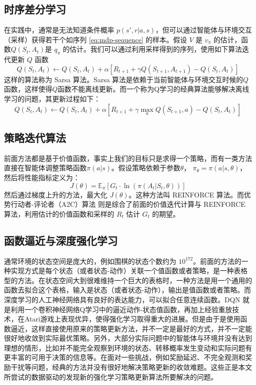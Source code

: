 \subsection{时序差分学习}
在实践中，通常是无法知道条件概率 $p(s', r | a, s)$，但可以通过智能体与环境交互（采样）获得若干个如序列 \ref{eq:mdp-sequence} 的样本。假设 $V$ 是 $v_\pi$ 的估计，函数$Q(S_t, A_t)$是 $q_\pi$ 的估计。我们可以通过利用采样得到的序列，使用如下算法迭代更新 $Q$ 函数
\begin{equation}
    Q(S_t, A_t) \leftarrow Q(S_t, A_t) + \alpha \left[ R_{t+1} + \gamma Q(S_{t+1}, A_{t+1}) - Q(S_t, A_t) \right]
\end{equation}
这样的算法称为 Sarsa 算法\cite{suttonReinforcementLearningIntroduction2018}。Sarsa 算法是依赖于当前智能体与环境交互时候的$Q$函数，这样使得$Q$函数不能离线更新。而一个称为Q学习\cite{watkinsQlearning1992}的经典算法能够解决离线学习的问题，其更新过程如下：
\begin{equation}
    Q(S_t, A_t) \leftarrow Q(S_t, A_t) + \alpha \left[ R_{t+1} + \gamma \max_{a} Q(S_{t+1}, a) - Q(S_t, A_t) \right]
\end{equation}


\subsection{策略迭代算法}
前面方法都是基于价值函数，事实上我们的目标只是求得一个策略，而有一类方法直接在智能体调整策略函数$\pi(a|s)$。假设策略依赖于参数$\theta$， $\pi_\theta = \pi(a|s,\theta)$，然后将性能指标定义为：
\begin{equation}
    J(\theta) = \mathbb{E}_\pi \left[ G_t \cdot  \ln(\pi(A_t|S_t, \theta))  \right]
\end{equation}
然后通过梯度上升的方法，最大化 $J(\theta)$。这种方法叫 REINFORCE 算法。而优势行动者-评论者（A2C）算法 \cite{mnihAsynchronousMethodsDeep2016} 则是综合了前面的价值迭代计算与 REINFORCE 算法，利用估计的价值函数和采样的 $R_t$ 估计 $G_t$ 的期望。


\subsection{函数逼近与深度强化学习}
通常环境的状态空间是庞大的，例如围棋的状态个数约为 $10^{172}$。前面的方法的一种实现方式是每个状态（或者状态-动作）关联一个值函数或者策略，是一种表格型的方法。在状态空间大到很难维持一个巨大的表格时，一种方法是用一个通用的函数去拟合这个表格，输入是状态（或者状态-动作），输出是值函数或者策略。而深度学习的人工神经网络具有良好的表达能力，可以拟合任意连续函数。DQN \cite{mnihPlayingAtariDeep2013} \cite{mnihHumanlevelControlDeep2015} 就是利用一个卷积神经网络Q学习中的逼近动作-状态值函数，再加上经验重放技术，在Atari游戏上表现优异，使得强化学习取得重大的进展。但是由于是使用函数逼近，这样直接使用原来的策略更新方法，并不一定是最好的方式，并不一定能很好地收敛到实际最优策略。另外，大部分实际问题中的智能体与环境并没有达到理想的情形，比如并不能完全观察到环境的状态、转移概率发生变动和实际问题有更丰富的可用于决策的信息等。在面对一些挑战，例如奖励延迟、不完全观测和奖励干扰等问题，经典的方法并没有很好地解决策略更新的收敛难题。这些正是本文所尝试的数据驱动的发现新的强化学习策略更新算法所要解决的问题。



